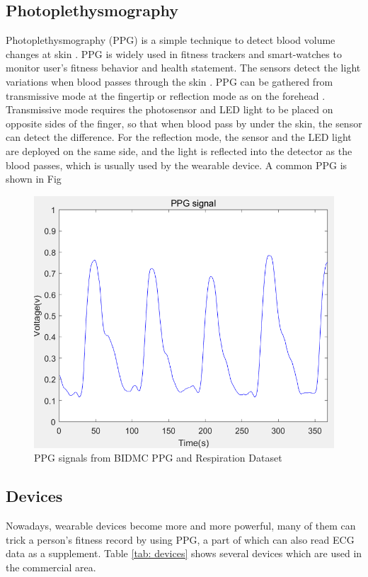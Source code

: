 \documentclass[a4paper,12pt]{article}
\begin{document}
\subsection{Photoplethysmography}
Photoplethysmography (PPG) is a simple technique to detect blood volume changes at skin \autocite{Karimian:2017human}. PPG is widely used in fitness trackers and smart-watches to monitor user's fitness behavior and health statement. The sensors detect the light variations when blood passes through the skin \autocite{Blasco:2018feasibility}. PPG can be gathered from transmissive mode at the fingertip or reflection mode as on the forehead \autocite{wiki:ppg}. Transmissive mode requires the photosensor and LED light to be placed on opposite sides of the finger, so that when blood pass by under the skin, the sensor can detect the difference. For the reflection mode, the sensor and the LED light are deployed on the same side, and the light is reflected into the detector as the blood passes, which is usually used by the wearable device. A common PPG is shown in Fig

\begin{figure}[H]
\centering
\includegraphics[width = .8\textwidth]{ppg.PNG}
\caption{PPG signals from BIDMC PPG and Respiration Dataset \autocite{PhysioNet}}
\label{fig:ppg}
\end{figure}

\subsection{Devices}
Nowadays, wearable devices become more and more powerful, many of them can trick a person's fitness record by using PPG, a part of which can also read ECG data as a supplement. Table \ref{tab: devices} shows several devices which are used in the commercial area.
\end{document}
